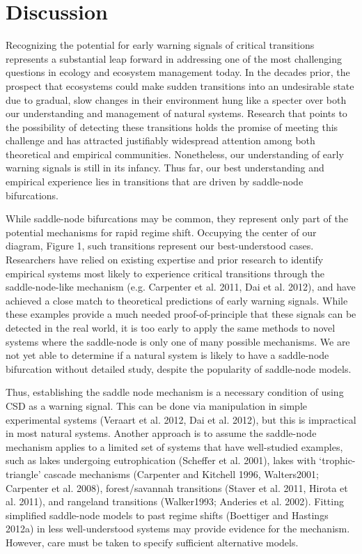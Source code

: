 \documentclass{article}
\begin{document}
\section{Discussion}

Recognizing the potential for early warning signals of critical
transitions represents a substantial leap forward in addressing one of
the most challenging questions in ecology and ecosystem management
today. In the decades prior, the prospect that ecosystems could make
sudden transitions into an undesirable state due to gradual, slow
changes in their environment hung like a specter over both our
understanding and management of natural systems. Research that points to
the possibility of detecting these transitions holds the promise of
meeting this challenge and has attracted justifiably widespread
attention among both theoretical and empirical communities. Nonetheless,
our understanding of early warning signals is still in its infancy. Thus
far, our best understanding and empirical experience lies in transitions
that are driven by saddle-node bifurcations.

While saddle-node bifurcations may be common, they represent only part
of the potential mechanisms for rapid regime shift. Occupying the center
of our diagram, Figure 1, such transitions represent our best-understood
cases. Researchers have relied on existing expertise and prior research
to identify empirical systems most likely to experience critical
transitions through the saddle-node-like mechanism (e.g. Carpenter et
al. 2011, Dai et al. 2012), and have achieved a close match to
theoretical predictions of early warning signals. While these examples
provide a much needed proof-of-principle that these signals can be
detected in the real world, it is too early to apply the same methods to
novel systems where the saddle-node is only one of many possible
mechanisms. We are not yet able to determine if a natural system is
likely to have a saddle-node bifurcation without detailed study, despite
the popularity of saddle-node models.

Thus, establishing the saddle node mechanism is a necessary condition of
using CSD as a warning signal. This can be done via manipulation in
simple experimental systems (Veraart et al. 2012, Dai et al. 2012), but
this is impractical in most natural systems. Another approach is to
assume the saddle-node mechanism applies to a limited set of systems
that have well-studied examples, such as lakes undergoing eutrophication
(Scheffer et al. 2001), lakes with `trophic-triangle' cascade mechanisms
(Carpenter and Kitchell 1996, Walters2001; Carpenter et al. 2008),
forest/savannah transitions (Staver et al. 2011, Hirota et al. 2011),
and rangeland transitions (Walker1993; Anderies et al. 2002). Fitting
simplified saddle-node models to past regime shifts (Boettiger and
Hastings 2012a) in less well-understood systems may provide evidence for
the mechanism. However, care must be taken to specify sufficient
alternative models.
\end{document}
